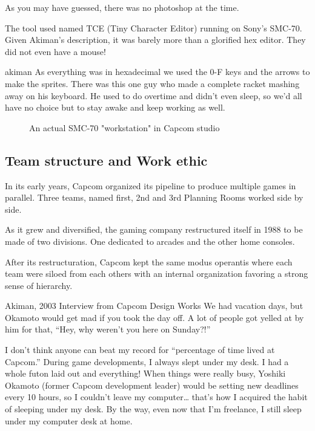 As you may have guessed, there was no photoshop at the time.




The tool used named TCE (Tiny Character Editor) running on Sony's SMC-70. Given Akiman's description, it was barely more than a glorified hex editor. They did not even have a mouse!

\begin{q}{akiman\cite{ar20160404}}
  As everything was in hexadecimal we used the 0-F keys and the arrows to make the sprites. There was this one guy who made a complete racket mashing away on his keyboard. He used to do overtime and didn't even sleep, so we'd all have no choice but to stay awake and keep working as well.
\end{q}

 \begin{figure}[H]
\caption*{An actual SMC-70 "workstation" in Capcom studio}
\end{figure}

\subsection{Team structure and Work ethic}

In its early years, Capcom organized its pipeline to produce multiple games in parallel. Three teams, named first, 2nd and 3rd Planning Rooms worked side by side. 

As it grew and diversified, the gaming company restructured itself in 1988 to be made of two divisions. One dedicated to arcades and the other home consoles. 

After its restructuration, Capcom kept the same modus operantis where each team were siloed from each others with an internal organization favoring a strong sense of hierarchy. 



\begin{q}{Akiman, 2003 Interview from Capcom Design Works}
  We had vacation days, but Okamoto would get mad if you took the day off. A lot of people got yelled at by him for that, “Hey, why weren’t you here on Sunday?!”

  I don’t think anyone can beat my record for “percentage of time lived at Capcom.” During game developments, I always slept under my desk. I had a whole futon laid out and everything! When things were really busy, Yoshiki Okamoto (former Capcom development leader) would be setting new deadlines every 10 hours, so I couldn’t leave my computer… that’s how I acquired the habit of sleeping under my desk. By the way, even now that I’m freelance, I still sleep under my computer desk at home.
  \end{q}


